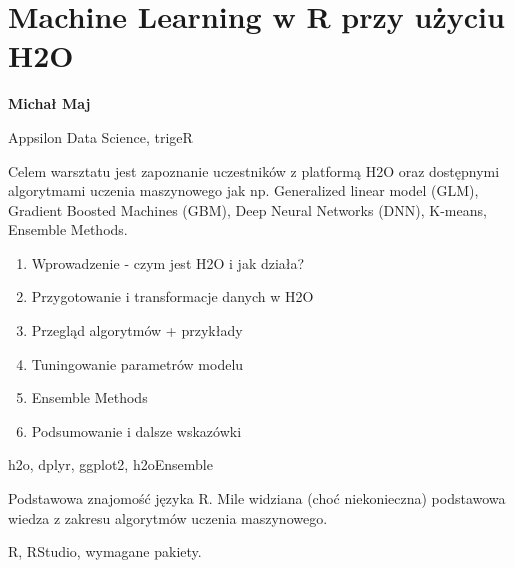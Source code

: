 \documentclass[\main/boa.tex]{subfiles}
\begin{document}
\section{Machine Learning w R przy użyciu H2O}

\begin{minipage}{0.915\textwidth}
\centering
{\bf {} Michał Maj}
\end{minipage}

\vskip 0.3cm

\begin{affiliations}
\begin{minipage}{0.915\textwidth}
\centering
\large Appsilon Data Science, trigeR  \\[2pt]
\end{minipage}
\end{affiliations}

\vskip 0.8cm

\opiswarsztatu Celem warsztatu jest zapoznanie uczestników z platformą H2O oraz dostępnymi algorytmami uczenia maszynowego jak np. Generalized linear model (GLM), Gradient Boosted Machines (GBM), Deep Neural Networks (DNN), K-means, Ensemble Methods.

\planwarsztatu
\begin{enumerate}
\item Wprowadzenie - czym jest H2O i jak działa?
\item Przygotowanie i transformacje danych w H2O
\item Przegląd algorytmów + przykłady
\item Tuningowanie parametrów modelu
\item Ensemble Methods
\item Podsumowanie i dalsze wskazówki
\end{enumerate}	 

\pakiety h2o, dplyr, ggplot2, h2oEnsemble

\umiejetnosci Podstawowa znajomość języka R. Mile widziana (choć niekonieczna) podstawowa wiedza z zakresu algorytmów uczenia maszynowego.

\wymagania R, RStudio, wymagane pakiety.
\end{document}
